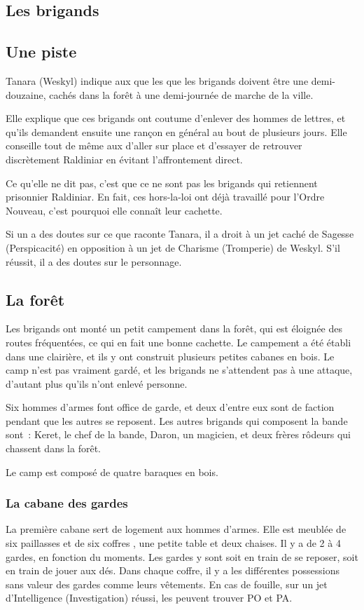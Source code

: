 \documentclass[a4paper,10pt,openany]{book}
\begin{document}
\begin{multicols}{2}
\section{Les brigands}
\subsection{Une piste}
Tanara (Weskyl) indique aux \PJs que les  que les brigands doivent être une demi-douzaine, cachés dans la forêt à une demi-journée de marche de
la ville. \par Elle explique que ces brigands ont coutume d’enlever des hommes de lettres, et qu’ils demandent ensuite une rançon en général au bout
de plusieurs jours. Elle conseille tout de même aux \PJs d’aller sur place et d’essayer de retrouver discrètement Raldiniar en évitant l’affrontement
direct.\par Ce qu’elle ne dit pas, c’est que ce ne sont pas les brigands qui retiennent prisonnier Raldiniar. En fait, ces hors-la-loi ont déjà
travaillé pour l’Ordre Nouveau, c’est pourquoi elle connaît leur cachette.\par Si un \PJ a des doutes sur ce que raconte Tanara, il a droit à un jet
caché de Sagesse (Perspicacité) en opposition à un jet de Charisme (Tromperie) de Weskyl. S’il réussit, il a des doutes sur le personnage.
\subsection{La forêt}
Les brigands ont monté un petit campement dans la forêt, qui est éloignée des routes fréquentées, ce qui en fait une bonne cachette. Le campement a
été établi dans une clairière, et ils y ont construit plusieurs petites cabanes en bois. Le camp n’est pas vraiment gardé, et les brigands ne
s’attendent pas à une attaque, d’autant plus qu’ils n’ont enlevé personne.\par Six hommes d’armes font office de garde, et deux d’entre eux sont de
faction pendant que les autres se reposent. Les autres brigands qui composent la bande sont : Keret, le chef de la bande, Daron, un magicien, et deux
frères rôdeurs qui chassent dans la forêt. \par Le camp est composé de quatre baraques en bois.
\subsubsection{La cabane des gardes} 
La première cabane sert de logement aux hommes d’armes. Elle est meublée de six paillasses et de six coffres , une petite table et deux chaises. Il y
a de 2 à 4 gardes, en fonction du moments. Les gardes y sont soit en train de se reposer, soit en train de jouer aux dés. Dans chaque coffre, il y a
les différentes possessions sans valeur des gardes comme leurs vêtements. En cas de fouille, sur un jet d'Intelligence (Investigation) réussi, les
\PJs peuvent trouver  PO et  PA.

\end{multicols}
\end{document}
